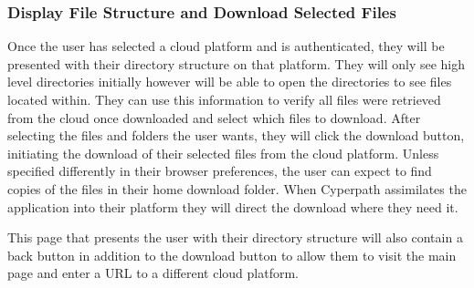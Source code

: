 \documentclass{article}
\begin{document}
            \subsubsection{Display File Structure and Download Selected Files}
            Once the user has selected a cloud platform and is authenticated, they will be presented with their directory structure on that platform. They will only see high level directories initially
            however will be able to open the directories to see files located within. They can use this information to verify all files were retrieved from the cloud once downloaded and select which
            files to download. After selecting the files and folders the user wants, they will click the download button, initiating the download of their selected files from the cloud platform.
            Unless specified differently in their browser preferences, the user can expect to find copies of the files in their home download folder.
            When Cyperpath assimilates the application into their platform they will direct the download where they need it.

            This page that presents the user with their directory structure will also contain a back button in addition to the download button to allow them to visit the main page and enter a URL to a different
            cloud platform.

\end{document}
